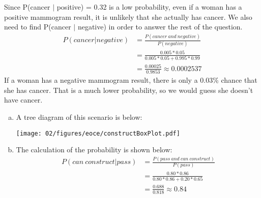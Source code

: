 
{Since P(cancer $|$ positive) = 0.32 is a low probability, even if a woman has a positive mammogram result, it is unlikely that she actually has cancer. We also need to find P(cancer $|$ negative) in order to answer the rest of the question. 
\begin{align*}
P(cancer | negative) &= \frac{P(cancer~and~negative)}{P(negative)} \\
&= \frac{0.005 * 0.05}{0.005 * 0.05 + 0.995 * 0.99} \\
&= \frac{0.00025}{0.9853} \approx 0.0002537
\end{align*}
If a woman has a negative mammogram result, there is only a 0.03\% chance that she has cancer. That is a much lower probability, so we would guess she doesn't have cancer.}



{
\begin{multicols}{2}
\begin{enumerate}[(a)]
\item A tree diagram of this scenario is below:
\begin{center}
\texttt{[image: 02/figures/eoce/constructBoxPlot.pdf]}
\end{center}
\item The calculation of the probability is shown below:
\begin{align*}
P(can~construct | pass) &= \frac{P(pass~and~can~construct)}{P(pass)} \\
&= \frac{0.80 * 0.86}{0.80 * 0.86 + 0.20 * 0.65} \\
&= \frac{0.688}{0.818} \approx 0.84
\end{align*}
\end{enumerate}
\end{multicols}
}\label{constructingBoxPlots}

